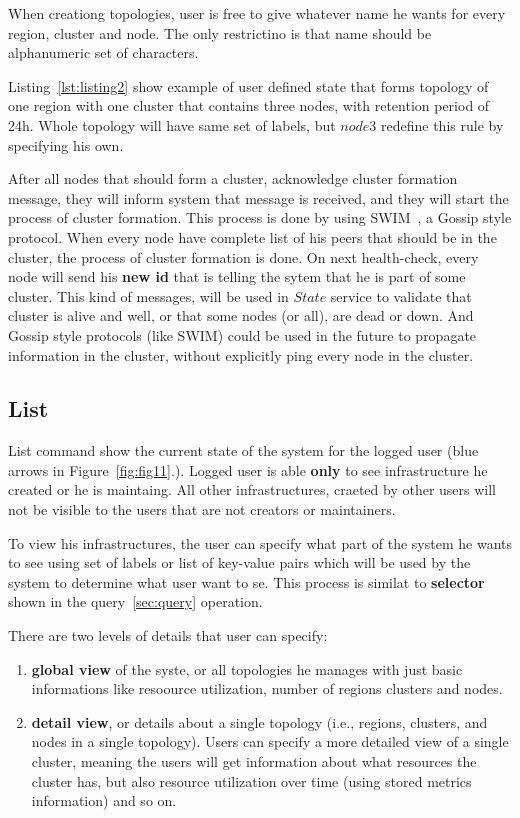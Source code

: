 When creationg topologies, user is free to give whatever name he wants for every region, cluster and node. The only restrictino is that name should be alphanumeric set of characters.

Listing~\ref{lst:listing2} show example of user defined state that forms topology of one region with one cluster that contains three nodes, with retention period of 24h. Whole topology will have same set of labels, but $node3$ redefine this rule by specifying his own.



After all nodes that should form a cluster, acknowledge cluster formation message, they will inform system that message is received, and they will start the process of cluster formation. This process is done by using SWIM~\cite{DasGM02}, a Gossip style protocol. When every node have complete list of his peers that should be in the cluster, the process of cluster formation is done. On next health-check, every node will send his \textbf{new id} that is telling the sytem that he is part of some cluster. This kind of messages, will be used in $State$ service to validate that cluster is alive and well, or that some nodes (or all), are dead or down. And Gossip style protocols (like SWIM) could be used in the future to propagate information in the cluster, without explicitly ping every node in the cluster.
%
%
\subsection{List}\label{sec:list}  
List command show the current state of the system for the logged user (blue arrows in Figure~\ref{fig:fig11}.). Logged user is able \textbf{only} to see infrastructure he created or he is maintaing. All other infrastructures, craeted by other users will not be visible to the users that are not creators or maintainers.

To view his infrastructures, the user can specify what part of the system he wants to see using set of labels or list of key-value pairs which will be used by the system to determine what user want to se. This process is similat to \textbf{selector} shown in the query~\ref{sec:query} operation. 

There are two levels of details that user can specify:

\begin{enumerate}[start=1,label={(\bfseries \arabic*)}]
	\item \textbf{global view}  of the syste, or all topologies he manages with just basic informations like resoource utilization, number of regions clusters and nodes.
	\item \textbf{detail view}, or details about a single topology (i.e., regions, clusters, and nodes in a single topology). Users can specify a more detailed view of a single cluster, meaning the users will get information about what resources the cluster has, but also resource utilization over time (using stored metrics information) and so on.
\end{enumerate}

